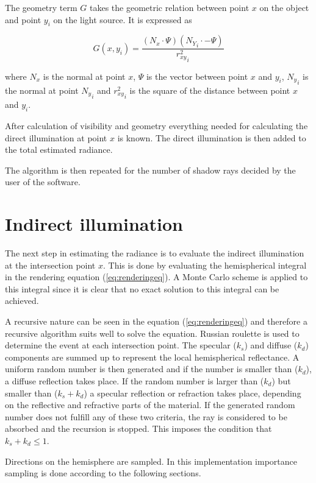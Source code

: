 \documentclass[a4paper]{report}
\begin{document}
The geometry term \(G\) takes the geometric relation between point
\(x\) on the object and point \(y_i\) on the light source. It is
expressed as

\begin{equation}
  G(x,y_i) = \frac{(N_x \cdot \Psi)({N_Y}_i \cdot -\Psi)}{{r^2_{xy}}_i}
  \label{eq:geometry}
\end{equation}

where \(N_x\) is the normal at point \(x\), \(\Psi\) is the vector
between point \(x\) and \(y_i\), \({N_y}_i\) is the normal at point
\({N_y}_i\) and \({r^2_{xy}}_i\) is the square of the distance between
point \(x\) and \(y_i\).

After calculation of visibility and geometry everything needed for
calculating the direct illumination at point \(x\) is known. The
direct illumination is then added to the total estimated radiance.

The algorithm is then repeated for the number of shadow rays decided
by the user of the software.

\section{Indirect illumination}

The next step in estimating the radiance is to evaluate the indirect
illumination at the intersection point \(x\). This is done by
evaluating the hemispherical integral in the rendering equation
(\ref{eq:renderingeq}). A Monte Carlo scheme is applied to this
integral since it is clear that no exact solution to this integral can
be achieved. 

A recursive nature can be seen in the equation (\ref{eq:renderingeq})
and therefore a recursive algorithm suits well to solve the
equation. Russian roulette is used to determine the event at each
intersection point. The specular (\(k_s\)) and diffuse (\(k_d\)) components are summed up
to represent the local hemispherical reflectance. A uniform random
number is then generated and if the number is smaller than (\(k_d\)), a
diffuse reflection takes place. If the random number is larger than
 (\(k_d\)) but smaller than (\(k_s+k_d\)) a specular reflection or
 refraction takes place, depending on the reflective and refractive
 parts of the material. If the generated random number does not
 fulfill any of these two criteria, the ray is considered to be
 absorbed and the recursion is stopped. This imposes the condition
 that \(k_s+k_d \leq 1\). 

Directions on the hemisphere are sampled. In this
implementation importance sampling is done according to the following sections.
\end{document}
